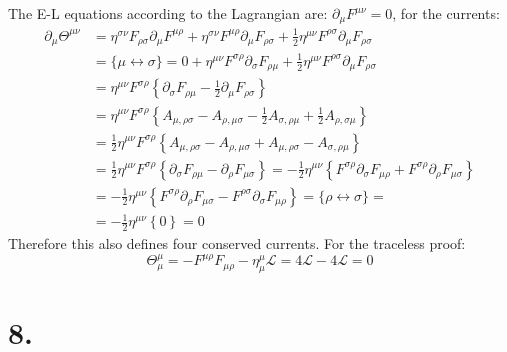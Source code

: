 \documentclass{article}
\newcommand{\pd}{\partial}  %
\newcommand{\pdm}{\partial_\mu}  %
\newcommand{\Lag}{\mathcal{L}}  %
\newcommand{\onehalf}{\frac{1}{2}}
\begin{document}
The E-L equations according to the Lagrangian are: $\pdm F^{\mu\nu} = 0$, for the currents:
\begin{equation}
    \begin{split}
        \pdm \Theta^{\mu\nu} & = \eta^{\sigma\nu}F_{\rho\sigma}\pdm F^{\mu\rho} + \eta^{\sigma\nu}F^{\mu\rho}\pdm F_{\rho\sigma}+\frac{1}{2}\eta^{\mu\nu}F^{\rho\sigma}\pdm F_{\rho\sigma}\\
        & = \{ \text{$\mu \leftrightarrow \sigma $}\}= 0 + \eta^{\mu\nu}F^{\sigma\rho}\pd_\sigma F_{\rho\mu} + \onehalf 
        \eta^{\mu\nu}F^{\rho\sigma}\pdm F_{\rho\sigma} \\
        & = \eta^{\mu\nu}F^{\sigma\rho} \left\{\pd_\sigma F_{\rho\mu} - \onehalf \pdm F_{\rho\sigma} \right\} \\
        & = \eta^{\mu\nu}F^{\sigma\rho} \left\{A_{\mu,\rho\sigma} - A_{\rho,\mu\sigma} - \onehalf A_{\sigma,\rho\mu} + \onehalf A_{\rho,\sigma\mu}  \right\} \\
        & = \onehalf \eta^{\mu\nu}F^{\sigma\rho} \left\{ A_{\mu,\rho\sigma} - A_{\rho,\mu\sigma} +  A_{\mu,\rho\sigma} - A_{\sigma,\rho\mu} \right\} \\
        & = \onehalf \eta^{\mu\nu}F^{\sigma\rho} \left\{ \pd_\sigma F_{\rho\mu} - \pd_\rho F_{\mu\sigma} \right\} = -
        \onehalf \eta^{\mu\nu} \left\{ F^{\sigma\rho}\pd_{\sigma}F_{\mu\rho} + F^{\sigma\rho}\pd_{\rho}F_{\mu\sigma} \right\}\\
        & = -\onehalf \eta^{\mu\nu} \left\{ F^{\sigma\rho} \pd_{\rho} F_{\mu\sigma} - F^{\rho\sigma}\pd_\sigma F_{\mu\rho}  \right\} = \{ \text{$\rho \leftrightarrow \sigma $}\}= \\
        & = -\onehalf \eta^{\mu\nu} \left\{ 0 \right\} = 0
    \end{split}
\end{equation}
Therefore this also defines four conserved currents. For the traceless proof:
\begin{equation}
    \Theta^\mu_\mu = -F^{\mu\rho}F_{\mu\rho} - \eta^{\mu}_\mu \Lag = 4\Lag - 4\Lag = 0
\end{equation}

\section*{8.}
\end{document}
